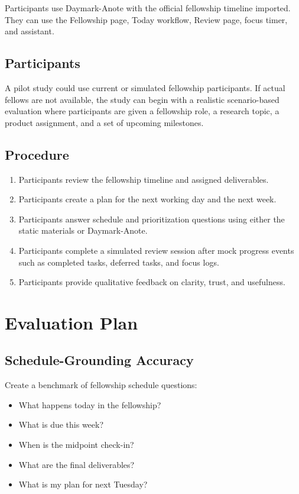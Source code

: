 \documentclass[11pt]{article}
\begin{document}
Participants use Daymark-Anote with the official fellowship timeline imported. They can use the Fellowship page, Today workflow, Review page, focus timer, and assistant.

\subsection{Participants}

A pilot study could use current or simulated fellowship participants. If actual fellows are not available, the study can begin with a realistic scenario-based evaluation where participants are given a fellowship role, a research topic, a product assignment, and a set of upcoming milestones.

\subsection{Procedure}

\begin{enumerate}[leftmargin=*]
  \item Participants review the fellowship timeline and assigned deliverables.
  \item Participants create a plan for the next working day and the next week.
  \item Participants answer schedule and prioritization questions using either the static materials or Daymark-Anote.
  \item Participants complete a simulated review session after mock progress events such as completed tasks, deferred tasks, and focus logs.
  \item Participants provide qualitative feedback on clarity, trust, and usefulness.
\end{enumerate}

\section{Evaluation Plan}

\subsection{Schedule-Grounding Accuracy}

Create a benchmark of fellowship schedule questions:

\begin{itemize}[leftmargin=*]
  \item What happens today in the fellowship?
  \item What is due this week?
  \item When is the midpoint check-in?
  \item What are the final deliverables?
  \item What is my plan for next Tuesday?
\end{itemize}
\end{document}
